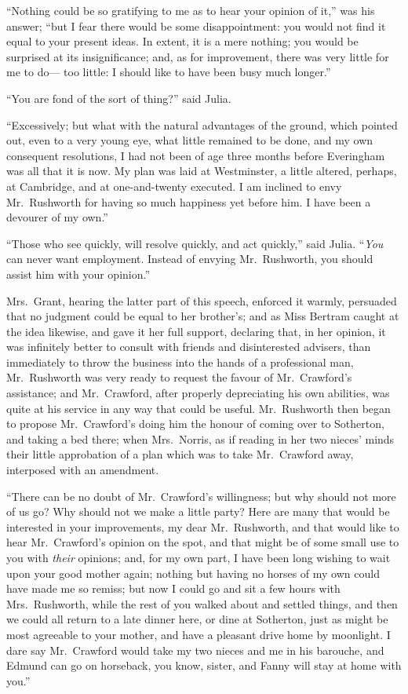 \documentclass{article}
\begin{document}
``Nothing could be so gratifying to me as to hear your
opinion of it,'' was his answer; ``but I fear there would
be some disappointment:  you would not find it equal
to your present ideas.  In extent, it is a mere nothing;
you would be surprised at its insignificance; and,
as for improvement, there was very little for me to do---%
too little:  I should like to have been busy much longer.''

``You are fond of the sort of thing?'' said Julia.

``Excessively; but what with the natural advantages of
the ground, which pointed out, even to a very young eye,
what little remained to be done, and my own consequent
resolutions, I had not been of age three months before
Everingham was all that it is now.  My plan was laid
at Westminster, a little altered, perhaps, at Cambridge,
and at one-and-twenty executed.  I am inclined to envy
Mr.\ Rushworth for having so much happiness yet before him.
I have been a devourer of my own.''

``Those who see quickly, will resolve quickly, and act quickly,''
said Julia.  ``\emph{You} can never want employment.
Instead of envying Mr.\ Rushworth, you should assist
him with your opinion.''

Mrs.\ Grant, hearing the latter part of this speech,
enforced it warmly, persuaded that no judgment could
be equal to her brother's; and as Miss Bertram caught
at the idea likewise, and gave it her full support,
declaring that, in her opinion, it was infinitely better
to consult with friends and disinterested advisers,
than immediately to throw the business into the hands of a
professional man, Mr.\ Rushworth was very ready to request
the favour of Mr.\ Crawford's assistance; and Mr.\ Crawford,
after properly depreciating his own abilities, was quite at
his service in any way that could be useful.  Mr.\ Rushworth
then began to propose Mr.\ Crawford's doing him the honour
of coming over to Sotherton, and taking a bed there;
when Mrs.\ Norris, as if reading in her two nieces'
minds their little approbation of a plan which was to take
Mr.\ Crawford away, interposed with an amendment.

``There can be no doubt of Mr.\ Crawford's willingness;
but why should not more of us go?  Why should not we
make a little party?  Here are many that would be
interested in your improvements, my dear Mr.\ Rushworth,
and that would like to hear Mr.\ Crawford's opinion on
the spot, and that might be of some small use to you with
\emph{their} opinions; and, for my own part, I have been long
wishing to wait upon your good mother again; nothing but
having no horses of my own could have made me so remiss;
but now I could go and sit a few hours with Mrs.\ Rushworth,
while the rest of you walked about and settled things,
and then we could all return to a late dinner here,
or dine at Sotherton, just as might be most agreeable to
your mother, and have a pleasant drive home by moonlight.
I dare say Mr.\ Crawford would take my two nieces and me
in his barouche, and Edmund can go on horseback, you know,
sister, and Fanny will stay at home with you.''
\end{document}
